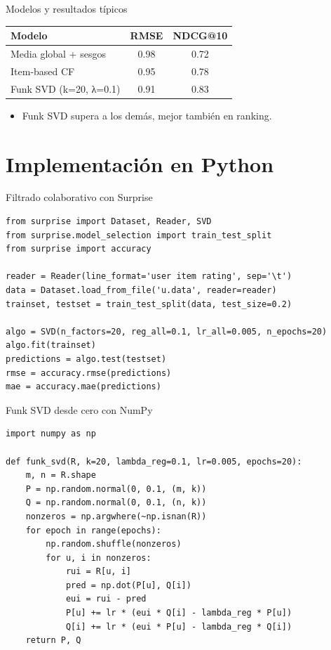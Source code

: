 \documentclass[aspectratio=169, 10pt, xcolor=table]{beamer}
\begin{document}
\begin{frame}{Modelos y resultados típicos}
    \begin{table}
        \centering
        \begin{tabular}{l|c|c}
            \toprule
            \textbf{Modelo} & \textbf{RMSE} & \textbf{NDCG@10} \\
            \midrule
            Media global + sesgos & 0.98 & 0.72 \\
            Item-based CF & 0.95 & 0.78 \\
            Funk SVD (k=20, λ=0.1) & 0.91 & 0.83 \\
            \bottomrule
        \end{tabular}
    \end{table}
    \begin{itemize}
        \item Funk SVD supera a los demás, mejor también en ranking.
    \end{itemize}
\end{frame}

\section{Implementación en Python}

\begin{frame}[fragile]{Filtrado colaborativo con Surprise}
    \begin{lstlisting}
from surprise import Dataset, Reader, SVD
from surprise.model_selection import train_test_split
from surprise import accuracy

reader = Reader(line_format='user item rating', sep='\t')
data = Dataset.load_from_file('u.data', reader=reader)
trainset, testset = train_test_split(data, test_size=0.2)

algo = SVD(n_factors=20, reg_all=0.1, lr_all=0.005, n_epochs=20)
algo.fit(trainset)
predictions = algo.test(testset)
rmse = accuracy.rmse(predictions)
mae = accuracy.mae(predictions)
    \end{lstlisting}
\end{frame}

\begin{frame}[fragile]{Funk SVD desde cero con NumPy}
    \begin{lstlisting}
import numpy as np

def funk_svd(R, k=20, lambda_reg=0.1, lr=0.005, epochs=20):
    m, n = R.shape
    P = np.random.normal(0, 0.1, (m, k))
    Q = np.random.normal(0, 0.1, (n, k))
    nonzeros = np.argwhere(~np.isnan(R))
    for epoch in range(epochs):
        np.random.shuffle(nonzeros)
        for u, i in nonzeros:
            rui = R[u, i]
            pred = np.dot(P[u], Q[i])
            eui = rui - pred
            P[u] += lr * (eui * Q[i] - lambda_reg * P[u])
            Q[i] += lr * (eui * P[u] - lambda_reg * Q[i])
    return P, Q
    \end{lstlisting}
\end{frame}
\end{document}
